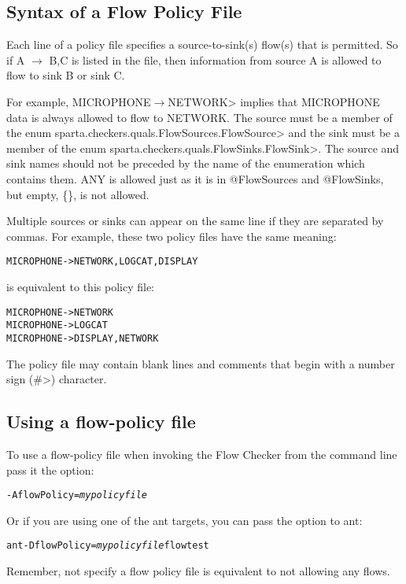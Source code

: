 \subsection{Syntax of a Flow Policy File}

Each line of a policy file specifies a source-to-sink(s) flow(s) that is permitted. So if 
A $\rightarrow$ B,C is listed in the file, then information from source A is allowed to flow
to sink B or sink C.  

For example,
\<MICROPHONE$\rightarrow$NETWORK> implies that
MICROPHONE data is always allowed to flow to NETWORK.  
The source must be a member of the enum
\<sparta.checkers.quals.FlowSources.FlowSource> and the sink must be a
member of the enum 
\<sparta.checkers.quals.FlowSinks.FlowSink>.  The source 
and sink names should not be preceded by the name of the enumeration which contains them.
ANY is allowed just as it is in @FlowSources and @FlowSinks, but empty, \{\}, is not allowed.

Multiple sources or sinks can appear on the same line if they are separated by commas. 
For example,
these two policy files have the same meaning:

\begin{alltt}
   MICROPHONE -> NETWORK, LOGCAT, DISPLAY
\end{alltt}
is equivalent to this policy file:
\begin{alltt}
   MICROPHONE -> NETWORK
   MICROPHONE -> LOGCAT
   MICROPHONE -> DISPLAY, NETWORK
\end{alltt}

The policy file may contain blank lines and comments that begin with 
a number sign (\<\#>) character.



\subsection{Using a flow-policy file}
To use a flow-policy file when invoking the Flow Checker from the
command line pass it the option:
\begin{alltt}
-AflowPolicy=\emph{mypolicyfile}
\end{alltt}

Or if you are using one of the ant targets, you can pass the option to ant:
\begin{alltt}
ant -DflowPolicy=\emph{mypolicyfile} flowtest
\end{alltt}

Remember, not specify a flow policy file is equivalent  to not allowing any flows. 

